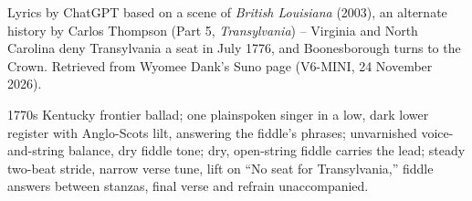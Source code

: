 
\begin{notes}
Lyrics by ChatGPT based on a scene of \emph{British Louisiana} (2003), an alternate history by Carlos Thompson (Part 5, \emph{Transylvania}) -- Virginia and North Carolina deny Transylvania a seat in July 1776, and Boonesborough turns to the Crown. Retrieved from Wyomee Dank's Suno page (V6-MINI, 24 November 2026).
\end{notes}
\begin{style}
1770s Kentucky frontier ballad; one plainspoken singer in a low, dark lower register with Anglo-Scots lilt, answering the fiddle’s phrases; unvarnished voice-and-string balance, dry fiddle tone; dry, open-string fiddle carries the lead; steady two-beat stride, narrow verse tune, lift on “No seat for Transylvania,” fiddle answers between stanzas, final verse and refrain unaccompanied.
\end{style}
